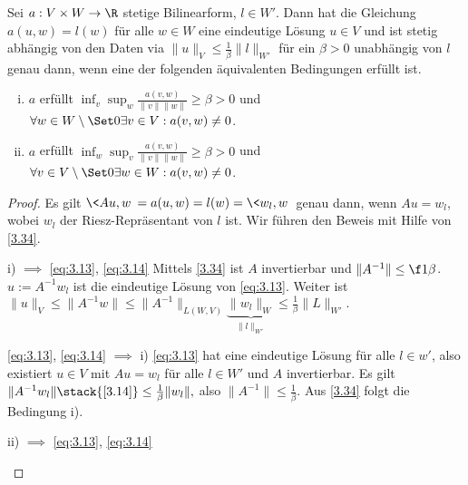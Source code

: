 \begin{st} \label{3.37}
	Sei $a: V \times W \to \R$ stetige Bilinearform, $l \in W'$.
	Dann hat die Gleichung
	\begin{math}[numbered] \label{eq:3.13}
		a(u,w) = l(w)
	\end{math}
	für alle $w \in W$ eine eindeutige Lösung $u \in V$ und ist stetig abhängig von den Daten via
	\begin{math}[numbered] \label{eq:3.14}
		\|u\|_V
		\le \frac{1}{\beta}\|l\|_{W'}
	\end{math}
	für ein $\beta > 0$ unabhängig von $l$ genau dann, wenn eine der folgenden äquivalenten Bedingungen erfüllt ist.
	\begin{enumerate}[i)]
		\item
			$a$ erfüllt $\inf_{v} \sup_{w} \frac{a(v,w)}{\|v\|\|w\|} \ge \beta > 0$ und $\forall w \in W \setminus \Set 0 \exists v \in V: a(v,w) \neq 0$.
		\item
			$a$ erfüllt $\inf_{w} \sup_{v} \frac{a(v,w)}{\|v\|\|w\|} \ge \beta > 0$ und $\forall v \in V \setminus \Set 0 \exists w \in W: a(v,w) \neq 0$.
	\end{enumerate}
	\begin{proof}
		Es gilt $\<Au,w\> = a(u,w) = l(w) = \<w_l, w\>$ genau dann, wenn $Au = w_l$, wobei $w_l$ der Riesz-Repräsentant von $l$ ist.
		Wir führen den Beweis mit Hilfe von \ref{3.34}.
		\begin{seg}{i) $\implies$ \eqref{eq:3.13}, \eqref{eq:3.14}}
			Mittels \ref{3.34} ist $A$ invertierbar und $\|A^{-1}\| \le \f 1\beta$.
			$u := A^{-1} w_l$ ist die eindeutige Lösung von \eqref{eq:3.13}.
			Weiter ist
			\begin{math}
				\|u\|_V
				\le \|A^{-1}w\|
				\le \|A^{-1}\|_{L(W,V)} \underbrace{\|w_l\|_{W}}_{\|l\|_{W'}}
				\le \frac{1}{\beta}\|L\|_{W'}.
			\end{math}
		\end{seg}
		\begin{seg}{\eqref{eq:3.13}, \eqref{eq:3.14} $\implies$ i)}
			\eqref{eq:3.13} hat eine eindeutige Lösung für alle $l \in w'$, also existiert $u \in V$ mit $Au = w_l$ für alle $l \in W'$ und $A$ invertierbar.
			Es gilt
			\begin{math}
				\|A^{-1} w_l\|
				\stack{\eqref{3.14}}\le \frac{1}{\beta}\|w_l\|,
			\end{math}
			also $\|A^{-1}\| \le \frac{1}{\beta}$.
			Aus \ref{3.34} folgt die Bedingung i).
		\end{seg}
		\begin{seg}{ii) $\implies$ \eqref{eq:3.13}, \eqref{eq:3.14}}

\end{seg}
\end{proof}
\end{st}

